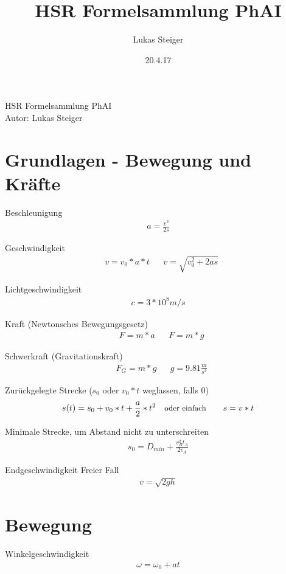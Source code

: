 \documentclass[17pt]{extarticle}
\author{Lukas Steiger}
\title{HSR Formelsammlung PhAI}
\date{20.4.17}
\begin{document}
\begin{center}
	\huge{HSR Formelsammlung PhAI} \\
	\small{Autor: Lukas Steiger}
\end{center}
	
\section{Grundlagen - Bewegung und Kräfte}

	Beschleunigung
	\begin{align}
		a = \frac{v^{2}}{2 s}
	\end{align}

	Geschwindigkeit
	\begin{align}
		&v = v_{0} * a * t
		&&v = \sqrt{ v_{0}^2 + 2 a s }
	\end{align}
	
	Lichtgeschwindigkeit
	\begin{align}
		c = 3 * 10^{8} m/s
	\end{align}
	
	Kraft \small{(Newtonsches Bewegungsgesetz)}
	\begin{align}
		&F = m * a
		&&F = m * g
	\end{align}
	
	Schwerkraft \small{(Gravitationskraft)}
	\begin{align}
		&F_{G} = m * g
		&&g = 9.81 \frac{m}{s^{2}} 
	\end{align}
	
	Zurückgelegte Strecke \small{($s_{0}$ oder $v_{0}*t$ weglassen, falls 0)}
	\begin{align}
		&s(t) = s_{0} + v_{0} * t + \frac{a}{2} * t^{2}
		&&\text{\small{oder einfach}}
		&&&s = v * t
	\end{align}
	
	Minimale Strecke, um Abstand nicht zu unterschreiten
	\begin{align}
		s_{0} = D_{min} + \frac{v_{B}^2 t_{A}}{2 v_{A}}
	\end{align}
	
	Endgeschwindigkeit Freier Fall
	\begin{align}
		v = \sqrt{2 g h}
	\end{align}
	
	\section{Bewegung}
	Winkelgeschwindigkeit
	\begin{align}
		\omega = \omega_{0} + at
	\end{align}
	
\end{document}
